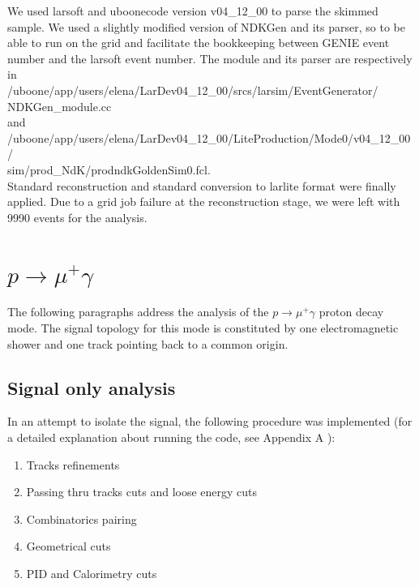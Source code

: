 \documentclass[a4paper, 10pt]{article}
\begin{document}
We used larsoft and uboonecode version v04\_12\_00 to parse the skimmed sample.
We used a slightly modified version of NDKGen and its parser, so to be able to run on the grid and facilitate the bookkeeping between GENIE event number and the larsoft event number. The module and its parser are respectively in \\
/uboone/app/users/elena/LarDev04\_12\_00/srcs/larsim/EventGenerator/\\
NDKGen\_module.cc \\
and  \\
/uboone/app/users/elena/LarDev04\_12\_00/LiteProduction/Mode0/v04\_12\_00/\\
sim/prod\_NdK/prodndkGoldenSim0.fcl. \\
Standard reconstruction and standard conversion to larlite format were finally applied. Due to a grid job failure at the reconstruction stage, we were left with 9990 events for the analysis. \\





\section{$p \rightarrow \mu^{+} \gamma$}
The following paragraphs address the analysis of the  $p \rightarrow \mu^{+} \gamma$  proton decay mode. 
The signal topology for this mode is constituted by one electromagnetic shower and one track pointing back to a common origin.


\subsection{Signal only analysis}

In an attempt to isolate the signal, the following procedure was implemented (for a detailed explanation about running the code, see Appendix A ):
\begin{enumerate}[topsep=10pt,itemsep=-1ex,partopsep=10pt,parsep=1ex]
\item Tracks refinements
\item Passing thru tracks cuts and loose energy cuts
\item Combinatorics pairing 
\item Geometrical cuts
\item PID and Calorimetry cuts 
\end{enumerate}
\end{document}
